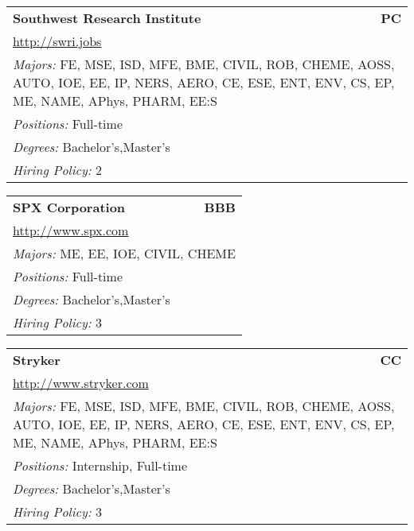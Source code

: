 \documentclass[twoside]{article}
\begin{document}
\begin{center}
\begin{multicols}{3}
\begin{FlushLeft}
\begin{minipage}{\columnwidth}\begin{tabularx}{.95\columnwidth}{Xr}
                 {\Large\bf Southwest Research Institute} & {\Large\bf PC}\\
    \multicolumn{2}{p{.95\columnwidth}}{\url{http://swri.jobs}}\\
    \multicolumn{2}{p{.95\columnwidth}}{\emph{Majors:} FE, MSE, ISD, MFE, BME, CIVIL, ROB, CHEME, AOSS, AUTO, IOE, EE, IP, NERS, AERO, CE, ESE, ENT, ENV, CS, EP, ME, NAME, APhys, PHARM, EE:S}\\
    \multicolumn{2}{p{.95\columnwidth}}{\emph{Positions:} Full-time}\\
    \multicolumn{2}{p{.95\columnwidth}}{\emph{Degrees:} Bachelor's,Master's}\\
    \multicolumn{2}{p{.95\columnwidth}}{\emph{Hiring Policy:} 2}\\
    \end{tabularx}
    
\end{minipage}
 
\begin{minipage}{\columnwidth}\begin{tabularx}{.95\columnwidth}{Xr}
                 {\Large\bf SPX Corporation} & {\Large\bf BBB}\\
    \multicolumn{2}{p{.95\columnwidth}}{\url{http://www.spx.com}}\\
    \multicolumn{2}{p{.95\columnwidth}}{\emph{Majors:} ME, EE, IOE, CIVIL, CHEME}\\
    \multicolumn{2}{p{.95\columnwidth}}{\emph{Positions:} Full-time}\\
    \multicolumn{2}{p{.95\columnwidth}}{\emph{Degrees:} Bachelor's,Master's}\\
    \multicolumn{2}{p{.95\columnwidth}}{\emph{Hiring Policy:} 3}\\
    \end{tabularx}
    
\end{minipage}
 
\begin{minipage}{\columnwidth}\begin{tabularx}{.95\columnwidth}{Xr}
                 {\Large\bf Stryker} & {\Large\bf CC}\\
    \multicolumn{2}{p{.95\columnwidth}}{\url{http://www.stryker.com}}\\
    \multicolumn{2}{p{.95\columnwidth}}{\emph{Majors:} FE, MSE, ISD, MFE, BME, CIVIL, ROB, CHEME, AOSS, AUTO, IOE, EE, IP, NERS, AERO, CE, ESE, ENT, ENV, CS, EP, ME, NAME, APhys, PHARM, EE:S}\\
    \multicolumn{2}{p{.95\columnwidth}}{\emph{Positions:} Internship, Full-time}\\
    \multicolumn{2}{p{.95\columnwidth}}{\emph{Degrees:} Bachelor's,Master's}\\
    \multicolumn{2}{p{.95\columnwidth}}{\emph{Hiring Policy:} 3}\\
    \end{tabularx}
    

\end{minipage}
\end{FlushLeft}
\end{multicols}
\end{center}
\end{document}
